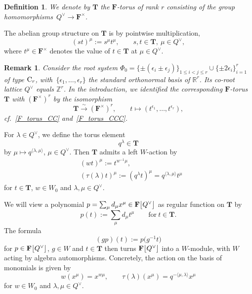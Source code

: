 \documentclass[pdftex]{sigma}
\numberwithin{equation}{section}
\newtheorem{Definition}[Theorem]{Definition}
\newtheorem{Remark}[Theorem]{Remark} }
\begin{document}
\begin{Definition}\label{T_def}
We denote by $\mathbf{T}$ the $\mathbf{F}$-torus of rank $r$ consisting of the group homomorphisms~$Q^\vee\rightarrow\mathbf{F}^\times$.
\end{Definition}
The abelian group structure on $\mathbf{T}$ is by pointwise multiplication,
\[ (st)^\mu:=s^\mu t^\mu,\qquad s,t\in\mathbf{T},\ \mu\in Q^\vee,
\]
where $t^\mu\in\mathbf{F}^\times$ denotes the value of $t\in\mathbf{T}$ at $\mu\in Q^\vee$.
\begin{Remark}
Consider the root system $\Phi_0=\{\pm(\epsilon_i\pm\epsilon_j)\}_{1\leq i<j\leq r}\cup\{\pm 2\epsilon_i\}_{i=1}^r$ of type ${\rm C}_r$, with~$\{\epsilon_1,\dots,\epsilon_r\}$ the standard orthonormal basis of $\mathbb{R}^r$. Its co-root lattice $Q^\vee$
equals $\mathbb{Z}^r$. In the introduction, we identified the corresponding $\mathbf{F}$-torus $\mathbf{T}$ with $(\mathbf{F}^\times)^r$ by the isomorphism
\[
\mathbf{T}\overset{\sim}{\longrightarrow}(\mathbf{F}^\times)^r,\qquad t\mapsto (t^{\epsilon_1},\dots,t^{\epsilon_r}),
\]
cf.~\eqref{F_torus_CC} and~\eqref{F_torus_CCC}.
\end{Remark}


For $\lambda\in Q^\vee$, we define the torus element
\[
q^\lambda\in\mathbf{T}
\]
by $\mu\mapsto q^{\langle \lambda,\mu\rangle}$, $\mu\in Q^\vee$. Then $\mathbf{T}$ admits a left $W$-action by
\begin{align}
&(wt)^\mu:=t^{w^{-1}\mu},\nonumber\\
&(\tau(\lambda)t)^\mu:=(q^\lambda t)^\mu=q^{\langle\lambda,\mu\rangle}t^\mu\label{Waction}
\end{align}
for $t\in\mathbf{T}$, $w\in W_0$ and $\lambda,\mu\in Q^\vee$.

We will view a polynomial $p=\sum_\mu d_\mu x^\mu\in\mathbf{F}\smash{\bigl[Q^\vee\bigr]}$ as regular function on $\mathbf{T}$ by
\[
p(t):=\sum_\mu d_\mu t^\mu\qquad \text{for}\ t\in\mathbf{T}.
\]
The formula
\[
(gp)(t):=p\bigl(g^{-1}t\bigr)
\]
for $p\in\mathbf{F}\smash{\bigl[Q^\vee\bigr]}$, $g\in W$ and $t\in\mathbf{T}$ then turns $\mathbf{F}\smash{\bigl[Q^\vee\bigr]}$ into a $W$-module, with $W$ acting by algebra automorphisms.
Concretely, the action on the basis of monomials is given by
\begin{equation}\label{Wa}
w(x^\mu)=x^{w\mu},\qquad
\tau(\lambda)(x^\mu)=q^{-\langle\mu,\lambda\rangle}x^\mu
\end{equation}
for $w\in W_0$ and $\lambda,\mu\in Q^\vee$.
\end{document}
